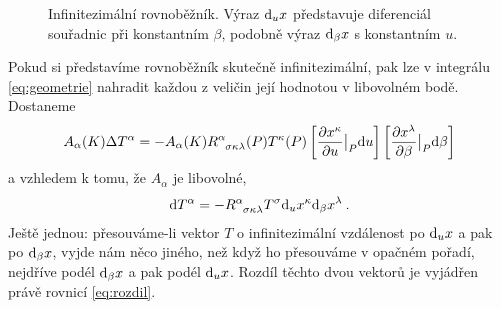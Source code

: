 \documentclass{article}
\begin{document}
    
\begin{figure}[H]
    \centering
    \caption{Infinitezimální rovnoběžník. Výraz $\mathrm{d}_u x$ představuje diferenciál souřadnic při konstantním $\beta$, podobně výraz $\mathrm{d}_\beta x$ s konstantním $u$.}
    \label{fig:rovnobeznik}
\end{figure}

Pokud si představíme rovnoběžník skutečně infinitezimální, pak lze v integrálu \eqref{eq:geometrie} nahradit každou z veličin její hodnotou v libovolném bodě. Dostaneme
\begin{align}
    A_\alpha(K) \Delta T^\alpha = - A_\alpha(K) R\indices{^\alpha_\sigma_\kappa_\lambda}(P) T^\kappa(P) \left[ \pder{x^\kappa}{u} \big|_{P} \D u \right] \left[ \pder{x^\lambda}{\beta} \big|_{P} \D \beta \right]
\end{align}
a vzhledem k tomu, že $A_\alpha$ je libovolné,
\begin{align}
    \D T^\alpha = - R\indices{^\alpha_\sigma_\kappa_\lambda} T^\sigma \D_u x^\kappa \D_\beta x^\lambda \:. \label{eq:rozdil}
\end{align}
Ještě jednou: přesouváme-li vektor $T$ o infinitezimální vzdálenost po $\mathrm{d}_u x$ a pak po $\mathrm{d}_\beta x$, vyjde nám něco jiného, než když ho přesouváme v opačném pořadí, nejdříve podél $\mathrm{d}_\beta x$ a pak podél $\mathrm{d}_u x$. Rozdíl těchto dvou vektorů je vyjádřen právě rovnicí \eqref{eq:rozdil}.
\end{document}
